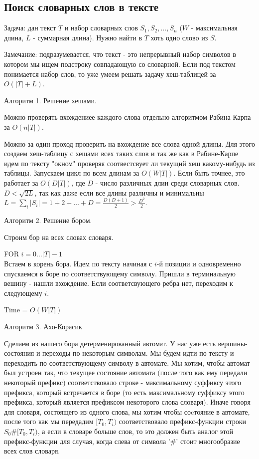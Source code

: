 \subsection{Поиск словарных слов в тексте}

Задача: дан текст $T$ и набор словарных слов $S_1, S_2, \dots, S_n$ ($W$ - максимальная длина, $L$ - суммарная длина). Нужно найти в $T$ хоть одно слово из $S$.

Замечание: подразумевается, что текст - это непрерывный набор символов в котором мы ищем подстроку совпадающую со словарной. Если под текстом понимается набор слов, то уже умеем решать задачу хеш-таблицей за $O(|T| + L)$.

Алгоритм 1. Решение хешами.

Можно проверять вхождениее каждого слова отдельно алгоритмом Рабина-Карпа за $O(n |T|)$.

Можно за один проход проверить на вхождение все слова одной длины. Для этого создаем хеш-таблицу с хешами всех таких слов и так же как в Рабине-Карпе идем по тексту "окном" проверяя соотвестсвует ли текущий хеш какому-нибудь из таблицы. Запускаем цикл по всем длинам за $O(W |T|)$. Если быть точнее, это работает за $O(D |T|)$, где $D$ - число различных длин среди словарных слов. $D < \sqrt{2 L}$, так как даже если все длины различны и минимальны $L = \sum_i |S_i| = 1 + 2 + \dots + D = \frac{D (D + 1)}{2} > \frac{D^2}{2}$.

Алгоритм 2. Решение бором.

Строим бор на всех словах словаря.

FOR $i = 0 \dots |T| - 1$\\
Встаем в корень бора. Идем по тексту начиная с $i$-й позиции и одновременно спускаемся в боре по соответствующему символу. Пришли в терминальную вешину - нашли вхождение. Если соответсвующего ребра нет, переходим к следующему $i$.

Time =  $O(W |T|)$

Алгоритм 3. Ахо-Корасик

Сделаем из нашего бора детерменированный автомат. У нас уже есть вершины-состояния и переходы по некоторым символам. Мы будем идти по тексту и переходить по соответствующему символу в автомате. Мы хотим, чтобы автомат был устроен так, что текущее состояние автомата (после того как ему передали некоторый префикс) соответствовало строке - максимальному суффиксу этого префикса, который встречается в боре (то есть максимальному суффиксу этого префикса, который является префиксом некоторого слова словаря). Иначе говоря для словаря, состоящего из одного слова, мы хотим чтобы соcтояние в автомате, после того как мы передадим $[T_0, T_i)$ соответствовало префикс-функции строки $S_0\#[T_0, T_i)$, а если в словаре больше слов, то это должен быть аналог этой префикс-функции для случая, когда слева от символа '\#' стоит многообразие всех слов словаря.

